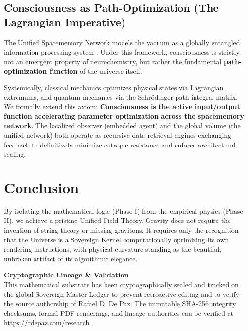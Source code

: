 \documentclass[12pt, a4paper]{article}
\theoremstyle{plain}
\theoremstyle{definition}
\begin{document}
\subsection{Consciousness as Path-Optimization (The Lagrangian Imperative)}

The Unified Spacememory Network models the vacuum as a globally entangled information-processing system \citep{Haramein2023}. Under this framework, consciousness is strictly not an emergent property of neurochemistry, but rather the fundamental \textbf{path-optimization function} of the universe itself.

Systemically, classical mechanics optimizes physical states via Lagrangian extremums, and quantum mechanics via the Schr\"{o}dinger path-integral matrix. We formally extend this axiom: \textbf{Consciousness is the active input/output function accelerating parameter optimization across the spacememory network}. The localized observer (embedded agent) and the global volume (the unified network) both operate as recursive data-retrieval engines exchanging feedback to definitively minimize entropic resistance and enforce architectural scaling.

\section{Conclusion}

By isolating the mathematical logic (Phase I) from the empirical physics (Phase II), we achieve a pristine Unified Field Theory. Gravity does not require the invention of string theory or missing gravitons. It requires only the recognition that the Universe is a Sovereign Kernel computationally optimizing its own rendering instructions, with physical curvature standing as the beautiful, unbroken artifact of its algorithmic elegance.


\vspace{2em}
\noindent\hrulefill
\vspace{1em}

\noindent\textbf{Cryptographic Lineage \& Validation}\\
This mathematical substrate has been cryptographically sealed and tracked on the global Sovereign Master Ledger to prevent retroactive editing and to verify the source authorship of Rafael D. De Paz. The immutable SHA-256 integrity checksums, formal PDF renderings, and lineage authorities can be verified at \url{https://rdepaz.com/research}.



\end{document}
